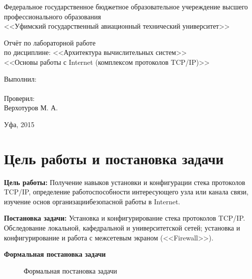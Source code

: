 \documentclass[a4paper]{article}
\author{Пахтусов Н. Г., ПРО-306}
\begin{document}
\begin{center}
\thispagestyle{empty} 

Федеральное государственное бюджетное образовательное учереждение высшего \\
профессионального образования\\
<<Уфимский государственный авиационный технический университет>>
\vspace*{\fill}
\begingroup
\centering

Отчёт по лабораторной работе\\
по дисциплине: <<Архитектура вычислительных систем>>\\
<<Основы работы с Internet (комплексом протоколов TCP/IP)>>

\endgroup
\vspace*{\fill}

\end{center}

\begin{flushright}

Выполнил:\\
\@author \\
Проверил: \\
Верхотуров М. А.

\end{flushright}

\begin{center}
Уфа, 2015
\end{center}

\clearpage
\tableofcontents
\clearpage

\section{Цель работы и постановка задачи}
\textbf{Цель работы:} Получение навыков установки и конфигурации стека протоколов TCP/IP, определение работоспособности интересующего узла или канала связи, изучение основ организациибезопасной работы в Internet.

\textbf{Постановка задачи:} Установка и конфигурирование стека протоколов TCP/IP. Обследование локальной, кафедральной и университетской сетей; установка и конфигурирование и работа с межсетевым экраном (<<Firewall>>).

\textbf{Формальная постановка задачи}

\begin{figure}[H]
			\caption{Формальная постановка задачи}
\end{figure}
\end{document}
